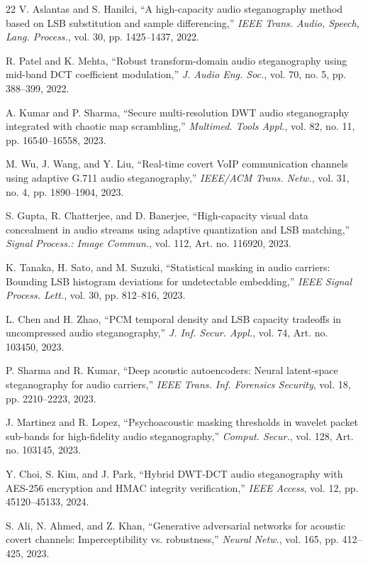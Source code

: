 \documentclass[10pt,conference]{IEEEtran}
\begin{document}
\begin{thebibliography}{22}
V. Aslantas and S. Hanilci, ``A high-capacity audio steganography method based on LSB substitution and sample differencing,'' \emph{IEEE Trans. Audio, Speech, Lang. Process.}, vol. 30, pp. 1425--1437, 2022.

R. Patel and K. Mehta, ``Robust transform-domain audio steganography using mid-band DCT coefficient modulation,'' \emph{J. Audio Eng. Soc.}, vol. 70, no. 5, pp. 388--399, 2022.

A. Kumar and P. Sharma, ``Secure multi-resolution DWT audio steganography integrated with chaotic map scrambling,'' \emph{Multimed. Tools Appl.}, vol. 82, no. 11, pp. 16540--16558, 2023.

M. Wu, J. Wang, and Y. Liu, ``Real-time covert VoIP communication channels using adaptive G.711 audio steganography,'' \emph{IEEE/ACM Trans. Netw.}, vol. 31, no. 4, pp. 1890--1904, 2023.

S. Gupta, R. Chatterjee, and D. Banerjee, ``High-capacity visual data concealment in audio streams using adaptive quantization and LSB matching,'' \emph{Signal Process.: Image Commun.}, vol. 112, Art. no. 116920, 2023.

K. Tanaka, H. Sato, and M. Suzuki, ``Statistical masking in audio carriers: Bounding LSB histogram deviations for undetectable embedding,'' \emph{IEEE Signal Process. Lett.}, vol. 30, pp. 812--816, 2023.

L. Chen and H. Zhao, ``PCM temporal density and LSB capacity tradeoffs in uncompressed audio steganography,'' \emph{J. Inf. Secur. Appl.}, vol. 74, Art. no. 103450, 2023.

P. Sharma and R. Kumar, ``Deep acoustic autoencoders: Neural latent-space steganography for audio carriers,'' \emph{IEEE Trans. Inf. Forensics Security}, vol. 18, pp. 2210--2223, 2023.

J. Martinez and R. Lopez, ``Psychoacoustic masking thresholds in wavelet packet sub-bands for high-fidelity audio steganography,'' \emph{Comput. Secur.}, vol. 128, Art. no. 103145, 2023.

Y. Choi, S. Kim, and J. Park, ``Hybrid DWT-DCT audio steganography with AES-256 encryption and HMAC integrity verification,'' \emph{IEEE Access}, vol. 12, pp. 45120--45133, 2024.

S. Ali, N. Ahmed, and Z. Khan, ``Generative adversarial networks for acoustic covert channels: Imperceptibility vs. robustness,'' \emph{Neural Netw.}, vol. 165, pp. 412--425, 2023.


\end{thebibliography}
\end{document}
